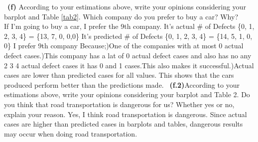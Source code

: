 \documentclass[a4 paper]{article}
\numberwithin{equation}{section}
\newcommand{\subproblem}[1]{~\newline\textbf{(#1)}}
\newcommand{\0}{\mathbf{0}}
\begin{document}
	\subproblem{f} According to your estimations above, write your opinions considering your barplot and Table \ref{tab2}. Which company do you prefer to buy a car? Why?\\
	If I'm going to buy a car, I prefer the 9th company.\newline
	It's actual \# of Defects \{0, 1, 2, 3, 4\} = \{13, 7, 0, 0,0\}\newline
	It's predicted \# of Defects \{0, 1, 2, 3, 4\} = \{14, 5, 1, 0, 0\}\newline
	I prefer 9th company Because;)One of the companies with at most 0 actual defect cases.)This company has a lat of 0 actual defect cases and also has no any 2 3 4 actual defect cases it has 0 and 1 cases.This also makes it successful.)Actual cases are lower than predicted cases for all values. This shows that the cars produced perform better than the predictions made.\newline
    \subproblem{f.2}According to your estimations above, write your opinions considering your barplot and Table 2. Do you
    think that road transportation is dangerous for us? Whether yes or no, explain your reason.\newline
    Yes, I think road transportation is dangerous. Since actual cases are higher than predicted cases in barplots and tables, dangerous results may occur when doing road transportation.
	
\end{document}
